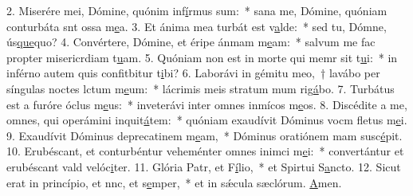 2. Miserére mei, Dómine, quónim inf\uline{í}rmus sum:~* sana me, Dómine, quóniam conturbáta snt ossa m\uline{e}a.
3. Et ánima mea turbát est v\uline{a}lde:~* sed tu, Dómne, ús\uline{que}quo?
4. Convértere, Dómine, et éripe ánmam m\uline{e}am:~* salvum me fac propter misericrdiam t\uline{u}am.
5. Quóniam non est in morte qui memr sit t\uline{u}i:~* in inférno autem quis confitbitur t\uline{i}bi?
6. Laborávi in gémitu meo,~† lavábo per síngulas noctes lctum m\uline{e}um:~* lácrimis meis stratum mum rig\uline{á}bo.
7. Turbátus est a furóre óclus m\uline{e}us:~* inveterávi inter omnes inmícos m\uline{e}os.
8. Discédite a me, omnes, qui operámini inquit\uline{á}tem:~* quóniam exaudívit Dóminus vocm fletus m\uline{e}i.
9. Exaudívit Dóminus deprecatinem m\uline{e}am,~* Dóminus oratiónem mam susc\uline{é}pit.
10. Erubéscant, et conturbéntur veheménter omnes inimci m\uline{e}i:~* convertántur et erubéscant vald velóc\uline{i}ter.
11. Glória Patr, et F\uline{í}lio,~* et Spirtui S\uline{a}ncto.
12. Sicut erat in princípio, et nnc, et s\uline{e}mper,~* et in sǽcula sæclórum. \uline{A}men.
